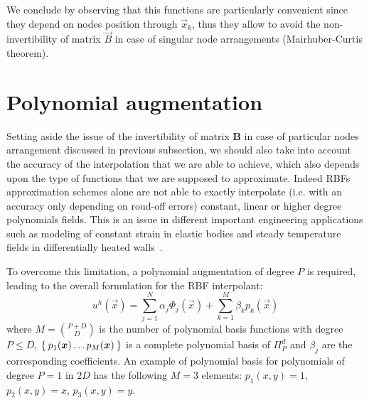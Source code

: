 We conclude by observing that this functions are particularly convenient since they depend on nodes position through $\vec{x}_k$, thus they allow to avoid the non-invertibility of matrix $\vec{B}$ in case of singular node arrangements (Mairhuber-Curtis theorem).



\section{Polynomial augmentation}
\label{sec:poly_augmentation}

Setting aside the issue of the invertibility of matrix $\boldsymbol{B}$ in case of particular nodes arrangement discussed in previous subsection, we should also take into account  the accuracy of the interpolation that we are able to achieve, which also depends upon the type of functions that we are supposed to approximate.
Indeed RBFs approximation schemes alone are not able to exactly interpolate (i.e. with an accuracy only depending on roud-off errors) constant, linear or higher degree polynomials fields. This is an issue in different important engineering applications such as modeling of constant strain in elastic bodies and steady temperature fields in differentially heated walls~\cite{Zamolo:phd_thesis}.

To overcome this limitation, a polynomial augmentation of degree $P$ is required, leading to the overall formulation for the RBF interpolant:
\begin{equation}
	\label{eqn:RBF_interpolator_plus_polynomial_augmentation}
	u^h(\vec{x}) = \sum_{j=1}^{N} \alpha_j \Phi_j(\vec{x}) + \sum_{k=1}^{M} \beta_k p_k(\vec{x})
\end{equation}
where $M=\binom{P+D}{D}$ is the number of polynomial basis functions with degree $P \le D$, $\Set{p_1(\boldsymbol{x}) \dots p_M({\boldsymbol{x}})}$ is a complete polynomial basis of $\Pi_P^d$ and $\beta_j$ are the corresponding coefficients. An example of polynomial basis for polynomials of degree $P=1$ in $2D$ has the following $M=3$ elements: $p_1(x,y) = 1$, $p_2(x,y) = x$, $p_3(x,y) = y$.

